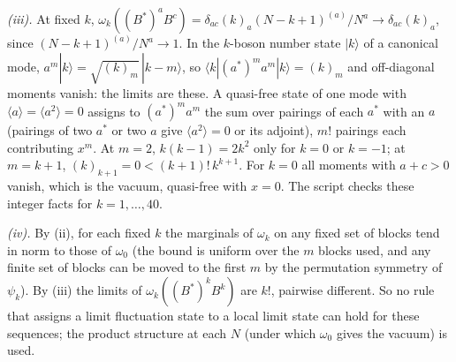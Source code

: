 \emph{(iii).} At fixed $k$, $\omega_{k}((B^{*})^{a}B^{c}) = \delta_{ac}(k)_{a}(N - k + 1)^{(a)}/N^{a} \to \delta_{ac}(k)_{a}$, since $(N - k + 1)^{(a)}/N^{a} \to 1$. In the $k$-boson number state $|k\rangle$ of a canonical mode, $a^{m}|k\rangle = \sqrt{(k)_{m}}\,|k - m\rangle$, so $\langle k|(a^{*})^{m}a^{m}|k\rangle = (k)_{m}$ and off-diagonal moments vanish: the limits are these. A quasi-free state of one mode with $\langle a\rangle = \langle a^{2}\rangle = 0$ assigns to $(a^{*})^{m}a^{m}$ the sum over pairings of each $a^{*}$ with an $a$ (pairings of two $a^{*}$ or two $a$ give $\langle a^{2}\rangle = 0$ or its adjoint), $m!$ pairings each contributing $x^{m}$. At $m = 2$, $k(k - 1) = 2k^{2}$ only for $k = 0$ or $k = -1$; at $m = k + 1$, $(k)_{k+1} = 0 < (k + 1)!\,k^{k+1}$. For $k = 0$ all moments with $a + c > 0$ vanish, which is the vacuum, quasi-free with $x = 0$. The script checks these integer facts for $k = 1, \dots, 40$.

\emph{(iv).} By (ii), for each fixed $k$ the marginals of $\omega_{k}$ on any fixed set of blocks tend in norm to those of $\omega_{0}$ (the bound is uniform over the $m$ blocks used, and any finite set of blocks can be moved to the first $m$ by the permutation symmetry of $\psi_{k}$). By (iii) the limits of $\omega_{k}((B^{*})^{k}B^{k})$ are $k!$, pairwise different. So no rule that assigns a limit fluctuation state to a local limit state can hold for these sequences; the product structure at each $N$ (under which $\omega_{0}$ gives the vacuum) is used.
